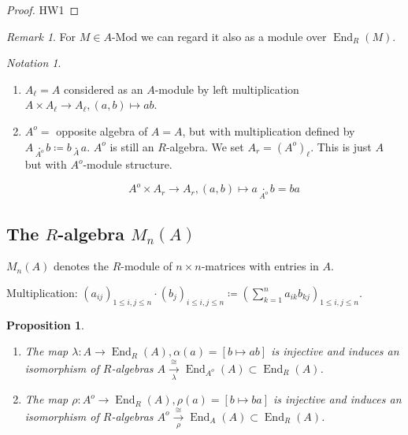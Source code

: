 \documentclass{article}
\theoremstyle{definition}
\theoremstyle{plain}
\newtheorem{proposition}[theorem]{Proposition}
\theoremstyle{remark}
\newtheorem{remark}[theorem]{Remark}
\newtheorem{notation}[theorem]{Notation}
\begin{document}
    \begin{proof}
        HW1
    \end{proof}

    \begin{remark}
        For \(M \in A\text{-Mod}\) we can regard it also as a module over \(\operatorname{End}_R(M)\).
    \end{remark}

    \begin{notation}
        \begin{enumerate}[label=\arabic*)]
            \item \(A_\ell = A\) considered as an \(A\)-module by left multiplication \(A \times A_\ell \to A_\ell, (a,b) \mapsto ab\).
            \item \(A^o =\) opposite algebra of \(A = A\), but with multiplication defined by \(A \underset{A^o}{\cdot} b \coloneqq b \underset{A}{\cdot} a\). \(A^o\) is still an \(R\)-algebra. We set \(A_r = (A^o)_\ell\). This is just \(A\) but with \(A^o\)-module structure.
            
            \[
                A^o \times A_r \to A_r, (a,b) \mapsto a \underset{A^o}{\cdot} b = ba
            \]
        \end{enumerate} 
    \end{notation}

    \subsection*{The \(R\)-algebra \(M_n(A)\)}

    \(M_n(A)\) denotes the \(R\)-module of \(n \times n\)-matrices with entries in \(A\).

    Multiplication: \((a_{ij})_{1 \leq i,j\leq n} \cdot (b_j)_{i \leq i,j \leq n} \coloneqq \left( \sum_{k = 1}^n a_{ik}b_{kj} \right)_{1 \leq i,j \leq n}\).
    
    \begin{proposition}
        \begin{enumerate}[label=\roman*)]
            \item The map \(\lambda : A \to \operatorname{End}_R(A), \alpha (a) = [b \mapsto ab]\) is injective and induces an isomorphism of \(R\)-algebras \(A \xrightarrow[\lambda]{\cong}\operatorname{End}_{A^o}(A) \subset \operatorname{End}_R(A)\). 
            \item The map \(\rho : A^o \to \operatorname{End}_R(A), \rho (a) = [b \mapsto ba]\) is injective and induces an isomorphism of \(R\)-algebras \(A^o \xrightarrow[\rho]{\cong} \operatorname{End}_A(A) \subset \operatorname{End}_R(A)\). 
        \end{enumerate} 
    \end{proposition}
\end{document}
